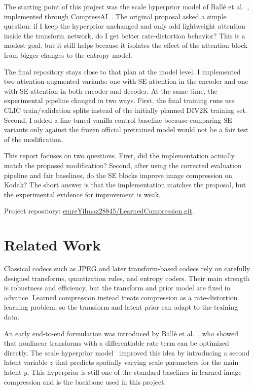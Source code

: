 \documentclass[10pt]{article}
\begin{document}
The starting point of this project was the scale hyperprior model of Ball\'e et al.~\cite{balle2018hyperprior}, implemented through CompressAI~\cite{begaint2020compressai}. The original proposal asked a simple question: if I keep the hyperprior unchanged and only add lightweight attention inside the transform network, do I get better rate-distortion behavior? This is a modest goal, but it still helps because it isolates the effect of the attention block from bigger changes to the entropy model.

The final repository stays close to that plan at the model level. I implemented two attention-augmented variants: one with SE attention in the encoder and one with SE attention in both encoder and decoder. At the same time, the experimental pipeline changed in two ways. First, the final training runs use CLIC train/validation splits instead of the initially planned DIV2K training set. Second, I added a fine-tuned vanilla control baseline because comparing SE variants only against the frozen official pretrained model would not be a fair test of the modification.

This report focuses on two questions. First, did the implementation actually match the proposed modification? Second, after using the corrected evaluation pipeline and fair baselines, do the SE blocks improve image compression on Kodak? The short answer is that the implementation matches the proposal, but the experimental evidence for improvement is weak.

Project repository: \href{https://github.com/emreYilmaz28845/LearnedCompression.git}{emreYilmaz28845/LearnedCompression.git}.

\section{Related Work}
Classical codecs such as JPEG and later transform-based codecs rely on carefully designed transforms, quantization rules, and entropy coders. Their main strength is robustness and efficiency, but the transform and prior model are fixed in advance. Learned compression instead treats compression as a rate-distortion learning problem, so the transform and latent prior can adapt to the training data.

An early end-to-end formulation was introduced by Ball\'e et al.~\cite{balle2017e2e}, who showed that nonlinear transforms with a differentiable rate term can be optimized directly. The scale hyperprior model~\cite{balle2018hyperprior} improved this idea by introducing a second latent variable \(z\) that predicts spatially varying scale parameters for the main latent \(y\). This hyperprior is still one of the standard baselines in learned image compression and is the backbone used in this project.
\end{document}
